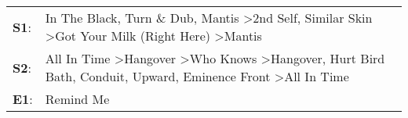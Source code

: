\begin{supertabular}{p{0.03\textwidth}p{0.92\textwidth}}
 \textbf{S1}:  &                                                                               In The Black\textsuperscript{}, \enspace Turn \& Dub\textsuperscript{}, \enspace Mantis\textsuperscript{} \textgreater \enspace 2nd Self\textsuperscript{}, \enspace Similar Skin\textsuperscript{} \textgreater \enspace Got Your Milk (Right Here)\textsuperscript{} \textgreater \enspace Mantis\textsuperscript{}  \enspace  \\
 \textbf{S2}:  &  All In Time\textsuperscript{} \textgreater \enspace Hangover\textsuperscript{} \textgreater \enspace Who Knows\textsuperscript{} \textgreater \enspace Hangover\textsuperscript{}, \enspace Hurt Bird Bath\textsuperscript{}, \enspace Conduit\textsuperscript{}, \enspace Upward\textsuperscript{}, \enspace Eminence Front\textsuperscript{} \textgreater \enspace All In Time\textsuperscript{}  \enspace  \\
 \textbf{E1}:  &                                                                                                                                                                                                                                                                                                                                                                         Remind Me\textsuperscript{}  \enspace  \\
\end{supertabular}
